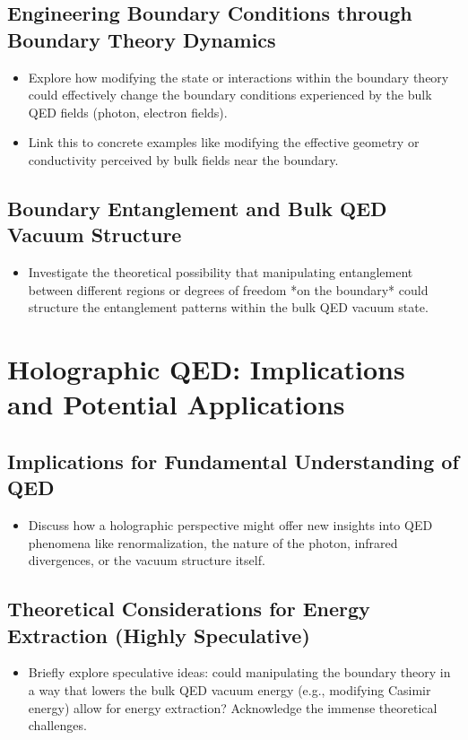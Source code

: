 \documentclass{amsart}
\begin{document}
\begin{itemize}
\subsection{Engineering Boundary Conditions through Boundary Theory Dynamics}
\begin{itemize}
    \item Explore how modifying the state or interactions within the boundary theory could effectively change the boundary conditions experienced by the bulk QED fields (photon, electron fields).
    \item Link this to concrete examples like modifying the effective geometry or conductivity perceived by bulk fields near the boundary.
\end{itemize}

\subsection{Boundary Entanglement and Bulk QED Vacuum Structure}
\begin{itemize}
    \item Investigate the theoretical possibility that manipulating entanglement between different regions or degrees of freedom *on the boundary* could structure the entanglement patterns within the bulk QED vacuum state.
\end{itemize}

\section{Holographic QED: Implications and Potential Applications}

\subsection{Implications for Fundamental Understanding of QED}
\begin{itemize}
    \item Discuss how a holographic perspective might offer new insights into QED phenomena like renormalization, the nature of the photon, infrared divergences, or the vacuum structure itself.
\end{itemize}

\subsection{Theoretical Considerations for Energy Extraction (Highly Speculative)}
\begin{itemize}
    \item Briefly explore speculative ideas: could manipulating the boundary theory in a way that lowers the bulk QED vacuum energy (e.g., modifying Casimir energy) allow for energy extraction? Acknowledge the immense theoretical challenges.
\end{itemize}


\end{itemize}
\end{document}
